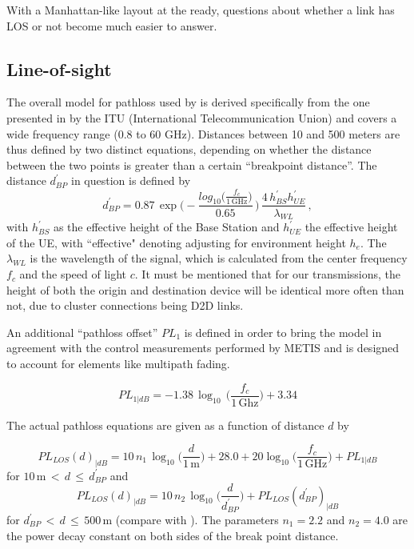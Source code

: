 With a Manhattan-like layout at the ready, questions about whether a link has LOS or not become much easier to answer.

\subsection{Line-of-sight} \label{LOS}
The overall model for pathloss used by \cite{Raschkowski} is derived specifically from the one presented in \cite{ReportITU-RM.2135-12009} by the ITU (International Telecommunication Union) and covers a wide frequency range (0.8 to 60 GHz). Distances between 10 and 500 meters are thus defined by two distinct equations, depending on whether the distance between the two points is greater than a certain ``breakpoint distance''. The distance $d^\prime_{BP}$ in question is defined by
\begin{equation} \label{eq:dbp}
d^\prime_{BP} = 0.87\, \exp\bigg( -\frac {log_{10} \big( \frac {f_c} {1\,\text{GHz}} \big)} {0.65} \,\bigg)\,\frac{4\,h^\prime_{BS}h^\prime_{UE}}{\lambda_{WL}}\,,
\end{equation}
with $h^\prime_{BS}$ as the effective height of the Base Station and $h^\prime_{UE}$ the effective height of the UE, with ``effective" denoting adjusting for environment height $h_e$. The $\lambda_{WL}$ is the wavelength of the signal, which is calculated from the center frequency $f_c$ and the speed of light $c$. It must be mentioned that for our transmissions, the height of both the origin and destination device will be identical more often than not, due to cluster connections being D2D links.

An additional ``pathloss offset'' $PL_1$ is defined in order to bring the model in agreement with the control measurements performed by METIS and is designed to account for elements like multipath fading.

\begin{equation} \label{eq:PL_1}
PL_{1|dB} = -1.38\,\log_{10}\,\bigg( \frac {f_c}{1\,\text{Ghz}} \bigg) + 3.34
\end{equation}


The actual pathloss equations are given as a function of distance $d$ by

\begin{equation} \label{eq:PL_LOS_1}
  PL_{LOS}(d)_{|dB} = 10\,n_1\,\log_{10}\bigg( \frac{d}{1\,\text{m}} \bigg) + 28.0 + 20 \log_{10} \bigg( \frac{f_c}{1\,\text{GHz}} \bigg) + PL_{1|dB}
\end{equation}
for $10\,\text{m}\,<\,d\, \le \,d^\prime_{BP}$ and
\begin{equation} \label{eq:PL_LOS_2}
  PL_{LOS}(d)_{|dB} = 10\,n_2\,\log_{10}\bigg( \frac{d}{d^\prime_{BP}} \bigg) + PL_{LOS}(d^\prime_{BP})_{|dB}
\end{equation}
for $d^\prime_{BP}\,<\,d\, \le \,500\,\text{m}$ (compare with \cite{Raschkowski}). The parameters $n_1 = 2.2$ and $n_2 = 4.0$ are the power decay constant on both sides of the break point distance.


